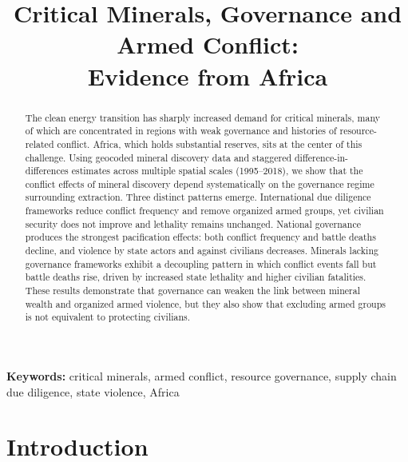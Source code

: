 \documentclass[11pt]{article}
\title{Critical Minerals, Governance and Armed Conflict: \\ Evidence from Africa}
\author{}
\date{}
\begin{document}
\maketitle

\begin{abstract}
\noindent The clean energy transition has sharply increased demand for critical minerals, many of which are concentrated in regions with weak governance and histories of resource-related conflict. Africa, which holds substantial reserves, sits at the center of this challenge. Using geocoded mineral discovery data and staggered difference-in-differences estimates across multiple spatial scales (1995--2018), we show that the conflict effects of mineral discovery depend systematically on the governance regime surrounding extraction. Three distinct patterns emerge. International due diligence frameworks reduce conflict frequency and remove organized armed groups, yet civilian security does not improve and lethality remains unchanged. National governance produces the strongest pacification effects: both conflict frequency and battle deaths decline, and violence by state actors and against civilians decreases. Minerals lacking governance frameworks exhibit a decoupling pattern in which conflict events fall but battle deaths rise, driven by increased state lethality and higher civilian fatalities. These results demonstrate that governance can weaken the link between mineral wealth and organized armed violence, but they also show that excluding armed groups is not equivalent to protecting civilians.

\end{abstract}

\noindent\textbf{Keywords:} critical minerals, armed conflict, resource governance, supply chain due diligence, state violence, Africa
\vspace{1em}

\section{Introduction}
\end{document}
